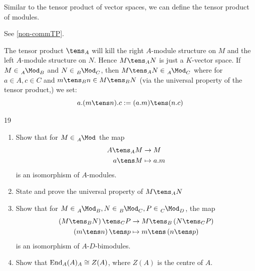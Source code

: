 \documentclass[twoside = false,	%
		headsepline,		%
		parskip = true,
		]{scrbook}						%
\begin{document}
    Similar to the tensor product of vector spaces, we can define the tensor product of modules.

    \begin{definition}{}{}
        See \ref{non-commTP}.
    \end{definition}

    The tensor product $\tens_A$ will kill the right $A$-module structure on $M$ and the left $A$-module structure on $N$. Hence $M \tens_A N$ is just a $K$-vector space. If $M \in \tensor[_A]{\Mod}{_B}$ and $N \in \tensor[_B]{\Mod}{_C}$, then $M \tens_A N \in \tensor[_A]{\Mod}{_C}$ where for $a \in A, c \in C$ and $m \tens_B n \in M \tens_B N$ (via the universal property of the tensor product,) we set:
    \begin{equation*}
        a.(m \tens n).c := (a.m) \tens (n.c)
    \end{equation*}

    \begin{exercise}{}{19}
        \begin{enumerate}
            \item Show that for $M \in \tensor[_A]{\Mod}{^{}}$ the map
            \begin{equation*}
            \begin{split}
                A \tens_A M &\to M \\
                a \tens M &\mapsto a.m
            \end{split}
            \end{equation*}
            is an isomorphism of $A$-modules.
            \item State and prove the universal property of $M \tens_A N$
            \item Show that for $M \in \tensor[_A]{\Mod}{_B}, N \in \tensor[_B]{\Mod}{_C}, P \in \tensor[_C]{\Mod}{_D}$, the map
            \begin{equation*}
            \begin{split}
                \round{M \tens_B N} \tens_C P &\to M \tens_B \round{N \tens_C P} \\
                \round{m \tens n} \tens p &\mapsto m \tens \round{n \tens p}
            \end{split}
            \end{equation*}
            is an isomorphism of $A$-$D$-bimodules.
            \item Show that $\mathrm{End}_A(A)_A \cong Z(A)$, where $Z(A)$ is the centre of $A$.
        \end{enumerate}
    \end{exercise}
\end{document}
